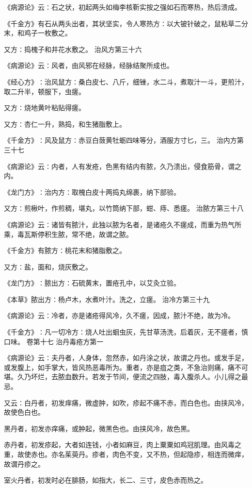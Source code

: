 \documentclass[a4paper,12pt,UTF8,twoside]{ctexbook}
\begin{document}
《病源论》云∶石之状，初起两头如梅李核靳实按之强如石而寒热，热后溃成。

《千金方》有石从两头出者，其状坚实，令人寒热方∶以大铍针破之，鼠粘草二分末，和鸡子一枚敷之。

又方∶捣槐子和井花水敷之。
治风方第三十六

《病源论》云∶风者，由风邪在经脉，经脉结聚所成也。

《经心方》∶治风鼠方∶桑白皮七、八斤，细锉，水二斗，煮取汁一斗，更煎汁，取二升半，顿服下，虫瘥。

又方∶烧地黄叶粘贴得瘥。

又方∶杏仁一升，熟捣，和生猪脂敷上。

《千金方》∶风及鼠方∶赤豆白蔹黄牡蛎四味等分，酒服方寸匕，三。
治内方第三十七

《病源论》云∶内者，人有发疮，色黑有结内有脓，久乃溃出，侵食筋骨，谓之内。

《龙门方》∶治内方∶取槐白皮十两捣丸绵裹，纳下部验。

又方∶煎楸叶，作煎稠，堪丸，以竹筒纳下部，蚶、痔、悉瘥。
治脓方第三十八

《病源论》云∶诸皆有脓汁，此独以脓为名者，是诸疮久不瘥成，而重为热气所乘，毒瓦斯停积生脓，常不绝，故谓之脓。

《千金方》有脓方∶桃花末和猪脂敷之。

又方∶盐，面和，烧灰敷之。

《龙门方》∶脓出方∶石硫黄末，置疮孔中，以艾灸立验。

《本草》脓出方∶杨卢木，水煮叶汁。洗之，立瘥。
治冷方第三十九

《病源论》云∶冷者，亦是诸疮得风冷，久不瘥，因成，脓汁不绝，故为冷。

《千金方》∶凡一切冷方∶烧人吐出蛔虫灰，先甘草汤洗，后着灰，无不瘥者，慎口味。
卷第十七
治丹毒疮方第一

《病源论》云∶夫丹者，人身体，忽然赤，如丹涂之状，故谓之丹也。或发手足，或发腹上，如手掌大，皆风热恶毒所为。重者，亦是疽之类，不急治则痛，痛不可堪。久乃坏烂，去脓血数升。若发于节间，便流之四肢，毒入腹杀人。小儿得之最忌。

又云∶白丹者，初发痒痛，微虚肿，如吹，疹起不痛不赤，而白色也。由挟风冷，故使色白也。

黑丹者，初发亦痒痛，或肿起，微黑色也。由挟风冷，故色黑。

赤丹者，初发疹起，大者如连钱，小者如麻豆，肉上粟粟如鸡冠肌理。由风毒之重，故使赤也。亦名茱萸丹。疹者，肉色不变，又不热，但起隐疹，相连而微痒，故谓丹疹之。

室火丹者，初发时必在腓肠，如指大，长二、三寸，皮色赤而热之。
\end{document}

